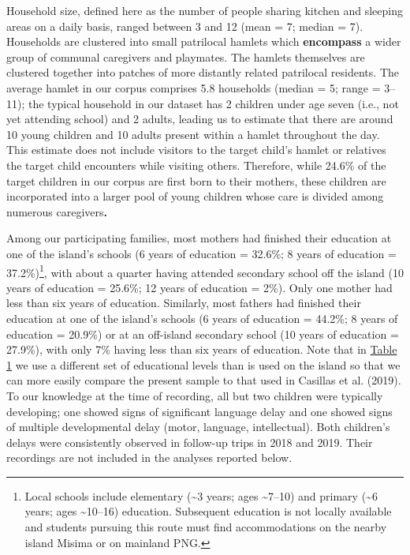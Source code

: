 \documentclass[,man,floatsintext]{apa6}
\begin{document}
Household size, defined here as the number of people sharing kitchen and
sleeping areas on a daily basis, ranged between 3 and 12 (mean = 7;
median = 7). Households are clustered into small patrilocal hamlets
which \textbf{encompass} a wider group of communal caregivers and
playmates. The hamlets themselves are clustered together into patches of
more distantly related patrilocal residents. The average hamlet in our
corpus comprises 5.8 households (median = 5; range = 3--11); the typical
household in our dataset has 2 children under age seven (i.e., not yet
attending school) and 2 adults, leading us to estimate that there are
around 10 young children and 10 adults present within a hamlet
throughout the day. This estimate does not include visitors to the
target child's hamlet or relatives the target child encounters while
visiting others. Therefore, while 24.6\% of the target children in our
corpus are first born to their mothers, these children are incorporated
into a larger pool of young children whose care is divided among
numerous caregivers\textbf{.}

Among our participating families, most mothers had finished their
education at one of the island's schools (6 years of education = 32.6\%;
8 years of education = 37.2\%)\footnote{Local schools include elementary
  (\textasciitilde{}3 years; ages \textasciitilde{}7--10) and primary
  (\textasciitilde{}6 years; ages \textasciitilde{}10--16) education.
  Subsequent education is not locally available and students pursuing
  this route must find accommodations on the nearby island Misima or on
  mainland PNG.}, with about a quarter having attended secondary school
off the island (10 years of education = 25.6\%; 12 years of education =
2\%). Only one mother had less than six years of education. Similarly,
most fathers had finished their education at one of the island's schools
(6 years of education = 44.2\%; 8 years of education = 20.9\%) or at an
off-island secondary school (10 years of education = 27.9\%), with only
7\% having less than six years of education. Note that in
\protect\hyperlink{tab1}{Table 1} we use a different set of educational
levels than is used on the island so that we can more easily compare the
present sample to that used in Casillas et al. (2019). To our knowledge
at the time of recording, all but two children were typically
developing; one showed signs of significant language delay and one
showed signs of multiple developmental delay (motor, language,
intellectual). Both children's delays were consistently observed in
follow-up trips in 2018 and 2019. Their recordings are not included in
the analyses reported below.
\end{document}
